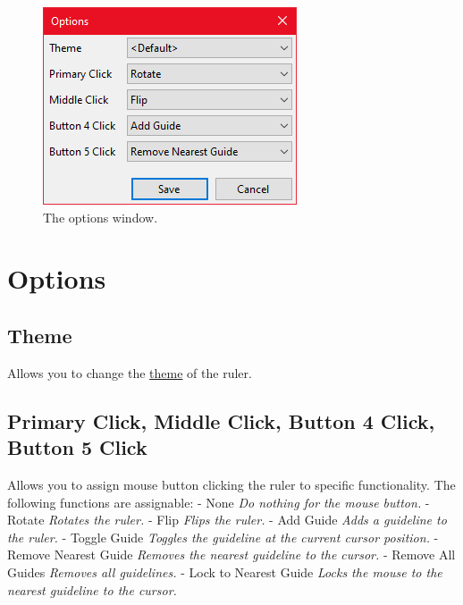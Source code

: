 \documentclass[
]{book}
\begin{document}
\begin{figure}
\includegraphics[width=1\linewidth]{images/options} \caption{The options window.}\label{fig:unnamed-chunk-4}
\end{figure}

\hypertarget{options}{%
\section{Options}\label{options}}

\hypertarget{theme}{%
\subsection{Theme}\label{theme}}

Allows you to change the \protect\hyperlink{themes}{theme} of the ruler.

\hypertarget{primary-click-middle-click-button-4-click-button-5-click}{%
\subsection{Primary Click, Middle Click, Button 4 Click, Button 5 Click}\label{primary-click-middle-click-button-4-click-button-5-click}}

Allows you to assign mouse button clicking the ruler to specific functionality.
The following functions are assignable:
- None \emph{Do nothing for the mouse button.}
- Rotate \emph{Rotates the ruler.}
- Flip \emph{Flips the ruler.}
- Add Guide \emph{Adds a guideline to the ruler.}
- Toggle Guide \emph{Toggles the guideline at the current cursor position.}
- Remove Nearest Guide \emph{Removes the nearest guideline to the cursor.}
- Remove All Guides \emph{Removes all guidelines.}
- Lock to Nearest Guide \emph{Locks the mouse to the nearest guideline to the cursor.}
\end{document}
